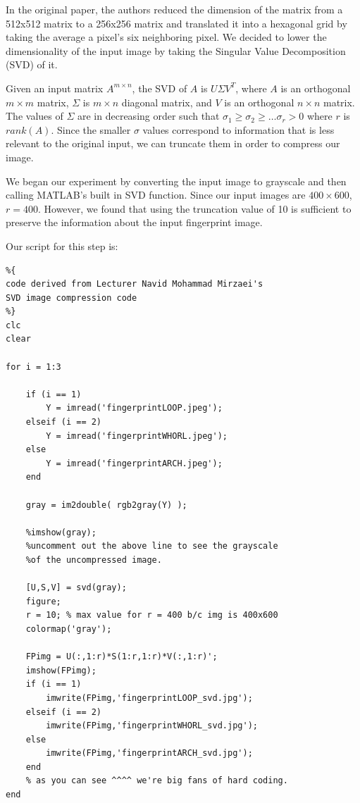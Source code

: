 \documentclass[letter]{amsart}
\begin{document}
In the original paper, the authors reduced the dimension of the matrix from a 512x512 matrix to a 256x256 matrix and translated it into a hexagonal grid by taking the average a pixel's six neighboring pixel. We decided to lower the dimensionality of the input image by taking the Singular Value Decomposition (SVD) of it. 

Given an input matrix $A^{m\times n}$, the SVD of $A$ is $U \Sigma V^T$, where $A$ is an orthogonal $m \times m$ matrix, $\Sigma$ is $m \times n$ diagonal matrix, and $V$ is an orthogonal $n \times n$ matrix. 
The values of $\Sigma$ are in decreasing order such that $\sigma_1 \geq \sigma_2 \geq \ldots \sigma_r > 0$ where $r$ is $rank(A)$. Since the smaller $\sigma$ values correspond to information that is less relevant to the original input, we can truncate them in order to compress our image. 

We began our experiment by converting the input image to grayscale and then calling MATLAB's built in SVD function. Since our input images are $400\times600$, $r=400$. However, we found that using the truncation value of 10 is sufficient to preserve the information about the input fingerprint image. 

Our script for this step is:
\begin{verbatim}
%{
code derived from Lecturer Navid Mohammad Mirzaei's
SVD image compression code
%}
clc
clear

for i = 1:3
    
    if (i == 1)
        Y = imread('fingerprintLOOP.jpeg');
    elseif (i == 2)
        Y = imread('fingerprintWHORL.jpeg');
    else
        Y = imread('fingerprintARCH.jpeg');
    end
    
    gray = im2double( rgb2gray(Y) );
    
    %imshow(gray);
    %uncomment out the above line to see the grayscale 
    %of the uncompressed image.
    
    [U,S,V] = svd(gray);
    figure;
    r = 10; % max value for r = 400 b/c img is 400x600
    colormap('gray');
    
    FPimg = U(:,1:r)*S(1:r,1:r)*V(:,1:r)';
    imshow(FPimg);
    if (i == 1)
        imwrite(FPimg,'fingerprintLOOP_svd.jpg');
    elseif (i == 2)
        imwrite(FPimg,'fingerprintWHORL_svd.jpg');
    else
        imwrite(FPimg,'fingerprintARCH_svd.jpg');
    end
    % as you can see ^^^^ we're big fans of hard coding.
end
\end{verbatim}
\end{document}
